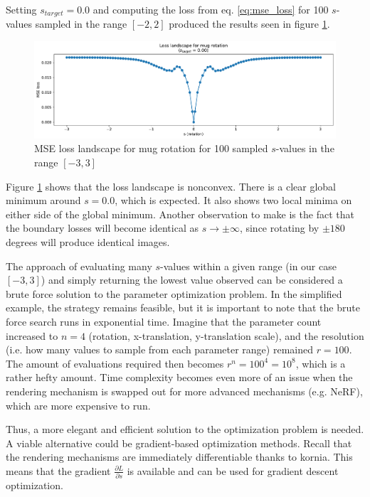 Setting $s_{target}= 0.0$ and computing the loss from eq. \ref{eq:mse_loss} for 100 $s$-values sampled in the range $[-2, 2]$ produced the results seen in figure \ref{fig:3_1-rotation-landscape}.

\begin{figure}[H]
    \centering
    \includegraphics[width=1.0\textwidth]{figures/3_1-rotation-landscape.pdf}
    \caption{MSE loss landscape for mug rotation for 100 sampled $s$-values in the range $[-3,3]$}
    \label{fig:3_1-rotation-landscape}
\end{figure}
Figure \ref{fig:3_1-rotation-landscape} shows that the loss landscape is nonconvex. There is a clear global minimum around $s=0.0$, which is expected. It also shows two local minima on either side of the global minimum. Another observation to make is the fact that the boundary losses will become identical as $s\rightarrow \pm \infty$, since rotating by $\pm 180$ degrees will produce identical images.

The approach of evaluating many $s$-values within a given range (in our case $[-3,3]$) and simply returning the lowest value observed can be considered a brute force solution to the parameter optimization problem. In the simplified example, the strategy remains feasible, but it is important to note that the brute force search runs in exponential time. Imagine that the parameter count increased to $n=4$ (rotation, x-translation, y-translation scale), and the resolution (i.e. how many values to sample from each parameter range) remained $r=100$. The amount of evaluations required then becomes $r^n = 100^4 = 10^8$, which is a rather hefty amount. Time complexity becomes even more of an issue when the rendering mechanism is swapped out for more advanced mechanisms (e.g. NeRF), which are more expensive to run.

Thus, a more elegant and efficient solution to the optimization problem is needed. A viable alternative could be gradient-based optimization methods. Recall that the rendering mechanisms are immediately differentiable thanks to kornia. This means that the gradient $\frac{\partial L}{\partial s}$ is available and can be used for gradient descent optimization.


